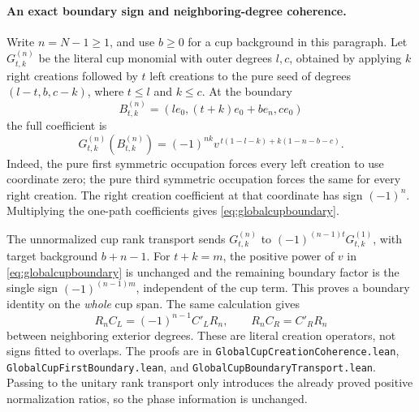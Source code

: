 \documentclass[10pt,a4paper]{article}
\newcommand{\lean}[1]{{\small\nolinkurl{#1}}}
\newenvironment{revision}{\begingroup}{\endgroup}
\begin{document}
\begin{revision}
\paragraph{An exact boundary sign and neighboring-degree coherence.}
Write $n=N-1\ge1$, and use $b\ge0$ for a cup background in this
paragraph. Let $G_{t,k}^{(n)}$ be the literal cup monomial with outer
degrees $l,c$, obtained by applying $k$ right creations followed by $t$
left creations to the pure seed of degrees $(l-t,b,c-k)$, where $t\le l$
and $k\le c$.
At the boundary
\[
 B_{t,k}^{(n)}=
 (l e_0,(t+k)e_0+b e_n,c e_0)
\]
the full coefficient is
\begin{equation}\label{eq:globalcupboundary}
 G_{t,k}^{(n)}(B_{t,k}^{(n)})=
 (-1)^{nk}v^{\,t(1-l-k)+k(1-n-b-c)}.
\end{equation}
Indeed, the pure first symmetric occupation forces every left creation
to use coordinate zero; the pure third symmetric occupation forces the
same for every right creation. The right creation coefficient at that
coordinate has sign $(-1)^n$. Multiplying the one-path coefficients
gives \eqref{eq:globalcupboundary}.

The unnormalized cup rank transport sends
$G_{t,k}^{(n)}$ to $(-1)^{(n-1)t}G_{t,k}^{(1)}$, with target background
$b+n-1$. For $t+k=m$, the positive power of $v$ in
\eqref{eq:globalcupboundary} is unchanged and the remaining boundary
factor is the single sign $(-1)^{(n-1)m}$, independent of the cup
term. This proves a boundary identity on the \emph{whole} cup span.
The same calculation gives
\[
 R_n C_L=(-1)^{n-1}C'_L R_n,
 \qquad R_n C_R=C'_R R_n
\]
between neighboring exterior degrees. These are literal creation
operators, not signs fitted to overlaps. The proofs are in
\lean{GlobalCupCreationCoherence.lean},
\lean{GlobalCupFirstBoundary.lean}, and
\lean{GlobalCupBoundaryTransport.lean}. Passing to the unitary rank
transport only introduces the already proved positive normalization
ratios, so the phase information is unchanged.


\end{revision}
\end{document}
